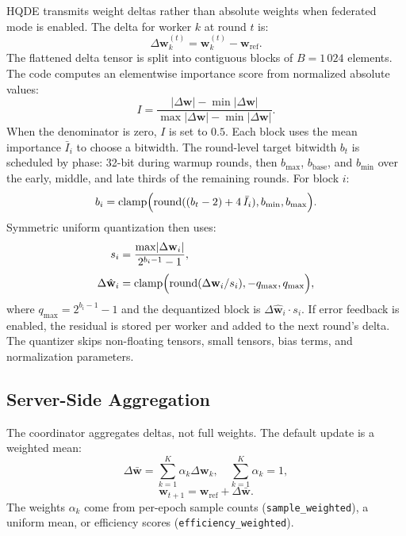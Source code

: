 \documentclass[journal,twoside]{IEEEtran}
\newcommand{\hqde}{\mbox{HQDE}\xspace}
\begin{document}
\hqde{} transmits weight deltas rather than absolute weights when
federated mode is enabled. The delta for worker $k$ at round $t$ is:
\begin{equation}
  \Delta\mathbf{w}_k^{(t)} = \mathbf{w}_k^{(t)} - \mathbf{w}_{\mathrm{ref}}.
  \label{eq:delta}
\end{equation}
The flattened delta tensor is split into contiguous blocks of
$B = 1\,024$ elements. The code computes an elementwise importance score
from normalized absolute values:
\begin{equation}
  I = \frac{\lvert\Delta\mathbf{w}\rvert - \min\lvert\Delta\mathbf{w}\rvert}
           {\max\lvert\Delta\mathbf{w}\rvert - \min\lvert\Delta\mathbf{w}\rvert}.
  \label{eq:importance}
\end{equation}
When the denominator is zero, $I$ is set to $0.5$. Each block uses the
mean importance $\bar{I}_i$ to choose a bitwidth. The round-level target
bitwidth $b_t$ is scheduled by phase: 32-bit during warmup rounds, then
$b_{\max}$, $b_{\mathrm{base}}$, and $b_{\min}$ over the early, middle,
and late thirds of the remaining rounds. For block $i$:
\begin{equation}
  b_i = \mathrm{clamp}\Bigl(\mathrm{round}((b_t - 2) + 4\,\bar{I}_i),
  b_{\min}, b_{\max}\Bigr).
  \label{eq:bits}
\end{equation}
Symmetric uniform quantization then uses:
\begin{align}
  s_i &= \frac{\max\lvert\Delta\mathbf{w}_i\rvert}{2^{b_i-1}-1},
  \label{eq:scale}\\[3pt]
  \Delta\hat{\mathbf{w}}_i &= \mathrm{clamp}\Bigl(
    \mathrm{round}(\Delta\mathbf{w}_i / s_i),
    -q_{\max}, q_{\max}\Bigr),
  \label{eq:quant}
\end{align}
where $q_{\max} = 2^{b_i-1}-1$ and the dequantized block is
$\Delta\hat{\mathbf{w}}_i \cdot s_i$. If error feedback is enabled,
the residual is stored per worker and added to the next round's delta.
The quantizer skips non-floating tensors, small tensors, bias terms, and
normalization parameters.

\subsection{Server-Side Aggregation}

The coordinator aggregates deltas, not full weights. The default update is
a weighted mean:
\begin{equation}
  \Delta\bar{\mathbf{w}} = \sum_{k=1}^K \alpha_k \Delta\mathbf{w}_k,
  \quad \sum_{k=1}^K \alpha_k = 1,
  \label{eq:agg}
\end{equation}
\begin{equation}
  \mathbf{w}_{t+1} = \mathbf{w}_{\mathrm{ref}} + \Delta\bar{\mathbf{w}}.
  \label{eq:agg_update}
\end{equation}
The weights $\alpha_k$ come from per-epoch sample counts
(\texttt{sample\_weighted}), a uniform mean, or efficiency scores
(\texttt{efficiency\_weighted}).
\end{document}

